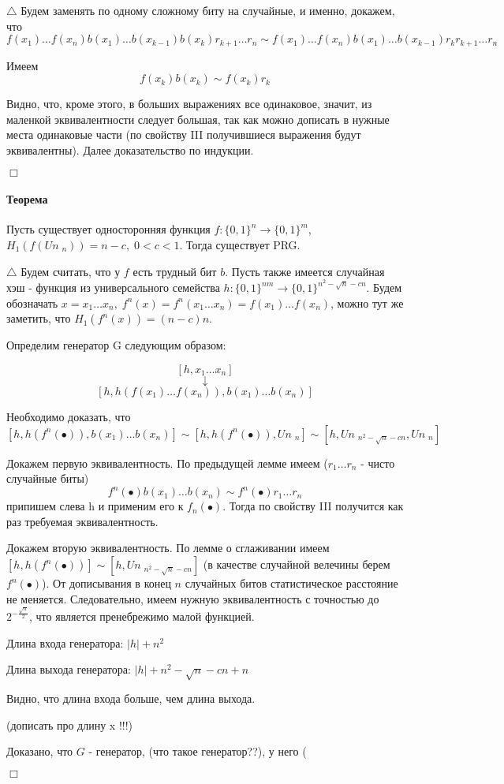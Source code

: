 \documentclass[12pt, a4paper]{article}
\newcommand{\uniform}{Un \;}
\newcommand{\bool}{\{0, 1\}}
\begin{document}
$\triangle$ Будем заменять по одному сложному биту на случайные, и именно, докажем, что 
$$f(x_1) \dots f(x_n) b(x_1) \dots b(x_{k - 1}) b(x_{k}) r_{k + 1} \dots r_{n} \sim f(x_1) \dots f(x_n) b(x_1) \dots b(x_{k - 1}) r_{k} r_{k + 1} \dots r_{n}$$

Имеем
$$f(x_k)b(x_k) \sim f(x_k) r_{k}$$

Видно, что, кроме этого, в больших выражениях все одинаковое, значит, из маленкой эквивалентности следует большая, так как можно дописать в нужные места одинаковые части (по свойству III получившиеся выражения будут эквивалентны). Далее доказательство по индукции.

$\Box$


\paragraph{Теорема} Пусть существует односторонняя функция $f:\bool^n \rightarrow \bool^m$, $H_1(f(\uniform_n)) = n - c, \; 0 < c < 1$. Тогда существует PRG.

$\triangle$ Будем считать, что у $f$ есть трудный бит $b$. Пусть также имеется случайная хэш - функция из универсального семейства $h : \bool^{nm} \rightarrow \bool^{n^2 - \sqrt{n} - cn}$. Будем обозначать $x = x_1 \dots x_n, \; f^n(x) = f^n(x_1 \dots x_n) = f(x_1) \dots f(x_n)$, можно тут же заметить, что $H_1(f^n(x)) = (n-c)n$.

Определим генератор G следующим образом:

$$[h, x_1 \dots x_n]$$
$$\downarrow $$
$$[h, h(f(x_1) \dots f(x_n)), b(x_1) \dots b(x_n)]$$

Необходимо доказать, что
$$[h, h(f^n(\bullet)), b(x_1) \dots b(x_n)] \sim [h, h(f^n(\bullet)), \uniform_n] \sim [h, \uniform_{n^2 - \sqrt{n} - cn}, \uniform_n]$$

Докажем первую эквивалентность. По предыдущей лемме имеем ($r_1 \dots r_n$ - чисто случайные биты)
$$f^n(\bullet)b(x_1) \dots b(x_n) \sim f^n(\bullet) r_1 \dots r_n$$
припишем слева h и применим его к $f_n(\bullet)$. Тогда по свойству III получится как раз требуемая эквивалентность.

Докажем вторую эквивалентность. По лемме о сглаживании имеем $[h, h(f^n(\bullet))] \sim [h, \uniform_{n^2 - \sqrt{n} - cn}]$ (в качестве случайной велечины берем $f^n(\bullet)$). От дописывания в конец $n$ случайных битов статистическое расстояние не меняется. Следовательно, имеем нужную эквивалентность с точностью до $2^{-\frac{\sqrt{n}}{2}}$, что является пренебрежимо малой функцией.

Длина входа генератора: $|h| + n^2$

Длина выхода генератора: $|h| + n^2 - \sqrt{n} - cn + n$

Видно, что длина входа больше, чем длина выхода.

(дописать про длину x !!!)

Доказано, что $G$ - генератор, (что такое генератор??), у него (

$\Box$
\end{document}
